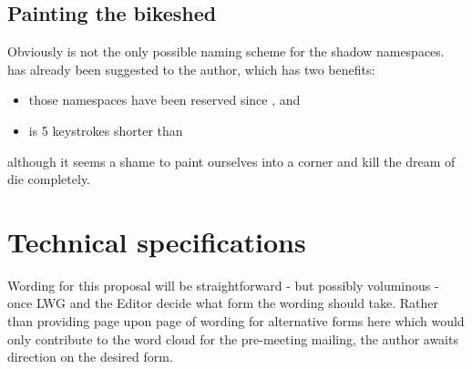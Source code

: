 \section{Painting the bikeshed}
Obviously  is not the only possible naming scheme for the
shadow namespaces.  has already been suggested to the author,
which has two benefits:
\begin{itemize}
\item those namespaces have been reserved since , and
\item {} is 5 keystrokes shorter than
\end{itemize}
although it seems a shame to paint ourselves into a corner and kill the dream
of  die completely.


\chapter{Technical specifications}
Wording for this proposal will be straightforward - but possibly voluminous -
once LWG and the Editor decide what form the wording should take. Rather than
providing page upon page of wording for alternative forms here which would only
contribute to the word cloud for the pre-meeting mailing, the author awaits
direction on the desired form.

